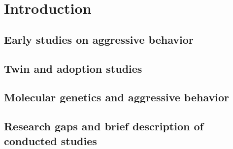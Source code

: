\chapter{Introduction}
\label{cha:introduction}


\section{Early studies on aggressive behavior}
\label{sec:early_studies_on_aggressive_behavior}

\section{Twin and adoption studies}
\label{sec:twin_and_adoption_studies}

\section{Molecular genetics and aggressive behavior}
\label{sec:molecular_genetics_and_aggressive_behavior}

\section{Research gaps and brief description of conducted studies}
\label{sec:research_gaps_and_brief_description_of_conducted_studies}




